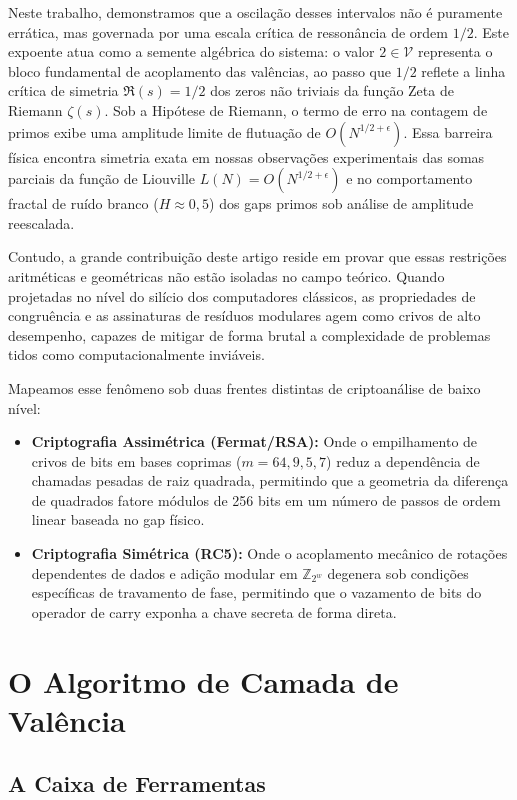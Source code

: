 \documentclass[12pt,a4paper]{article}
\theoremstyle{plain}
\begin{document}
Neste trabalho, demonstramos que a oscilação desses intervalos não é
puramente errática, mas governada por uma escala crítica de ressonância
de ordem $1/2$.  Este expoente atua como a semente algébrica do sistema:
o valor $2 \in \mathcal{V}$ representa o bloco fundamental de
acoplamento das valências, ao passo que $1/2$ reflete a linha crítica
de simetria $\Re(s) = 1/2$ dos zeros não triviais da função Zeta de
Riemann $\zeta(s)$.  Sob a Hipótese de Riemann, o termo de erro na
contagem de primos exibe uma amplitude limite de flutuação de
$O(N^{1/2+\epsilon})$.  Essa barreira física encontra simetria exata em
nossas observações experimentais das somas parciais da função de
Liouville $L(N) = O(N^{1/2+\epsilon})$ e no comportamento fractal de
ruído branco ($H \approx 0{,}5$) dos gaps primos sob análise de
amplitude reescalada.

Contudo, a grande contribuição deste artigo reside em provar que essas
restrições aritméticas e geométricas não estão isoladas no campo
teórico.  Quando projetadas no nível do silício dos computadores
clássicos, as propriedades de congruência e as assinaturas de resíduos
modulares agem como crivos de alto desempenho, capazes de mitigar de
forma brutal a complexidade de problemas tidos como computacionalmente
inviáveis.

Mapeamos esse fenômeno sob duas frentes distintas de criptoanálise de
baixo nível:
\begin{itemize}
  \item \textbf{Criptografia Assimétrica (Fermat/RSA):} Onde o
    empilhamento de crivos de bits em bases coprimas ($m = 64, 9, 5, 7$)
    reduz a dependência de chamadas pesadas de raiz quadrada, permitindo
    que a geometria da diferença de quadrados fatore módulos de 256 bits
    em um número de passos de ordem linear baseada no gap físico.
  \item \textbf{Criptografia Simétrica (RC5):} Onde o acoplamento
    mecânico de rotações dependentes de dados e adição modular em
    $\mathbb{Z}_{2^w}$ degenera sob condições específicas de travamento
    de fase, permitindo que o vazamento de bits do operador de carry
    exponha a chave secreta de forma direta.
\end{itemize}

\section{O Algoritmo de Camada de Valência}
\label{sec:alg}

\subsection{A Caixa de Ferramentas}
\label{sec:tools}
\end{document}
